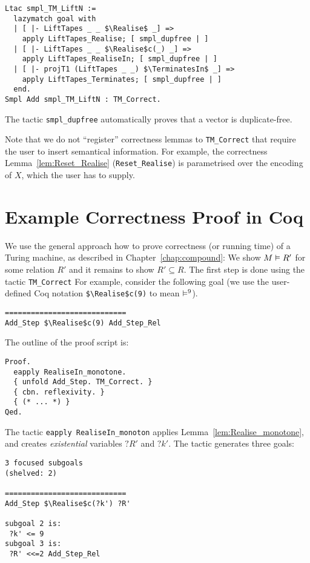 \begin{lstlisting}
Ltac smpl_TM_LiftN :=
  lazymatch goal with
  | [ |- LiftTapes _ _ $\Realise$ _] =>
    apply LiftTapes_Realise; [ smpl_dupfree | ]
  | [ |- LiftTapes _ _ $\Realise$c(_) _] =>
    apply LiftTapes_RealiseIn; [ smpl_dupfree | ]
  | [ |- projT1 (LiftTapes _ _) $\TerminatesIn$ _] =>
    apply LiftTapes_Terminates; [ smpl_dupfree | ]
  end.
Smpl Add smpl_TM_LiftN : TM_Correct.
\end{lstlisting}
The tactic \lstinline!smpl_dupfree! automatically proves that a vector is duplicate-free.

Note that we do not ``register'' correctness lemmas to \lstinline!TM_Correct! that require the user to insert semantical information.  For example,
the correctness Lemma~\ref{lem:Reset_Realise} (\lstinline!Reset_Realise!) is parametrised over the encoding of $X$, which the user has to supply.


\section*{Example Correctness Proof in Coq}
\label{sec:coq-correctness}

We use the general approach how to prove correctness (or running time) of a Turing machine, as described in Chapter~\ref{chap:compound}: We show
$M \mathrel{\vDash} R'$ for some relation $R'$ and it remains to show $R' \subseteq R$.  The first step is done using the tactic
\lstinline!TM_Correct!  For example, consider the following goal (we use the user-defined Coq notation \lstinline!$\Realise$c(9)! to mean
$\mathrel{\vDash^{9}}$).
\begin{lstlisting}
============================
Add_Step $\Realise$c(9) Add_Step_Rel
\end{lstlisting}
The outline of the proof script is:
\begin{lstlisting}
Proof.
  eapply RealiseIn_monotone.
  { unfold Add_Step. TM_Correct. }
  { cbn. reflexivity. }
  { (* ... *) }
Qed.
\end{lstlisting}

The tactic \lstinline!eapply RealiseIn_monoton! applies Lemma~\ref{lem:Realise_monotone}, and creates \textit{existential} variables $?R'$ and $?k'$.
The tactic generates three goals:
\begin{lstlisting}
3 focused subgoals
(shelved: 2)
  
============================
Add_Step $\Realise$c(?k') ?R'

subgoal 2 is:
 ?k' <= 9
subgoal 3 is:
 ?R' <<=2 Add_Step_Rel
\end{lstlisting}

